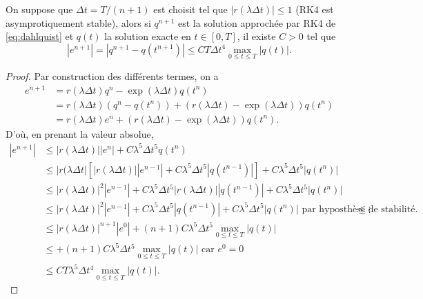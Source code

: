 \begin{proposition}
On suppose que $\Delta t = T/(n+1)$ est choisit tel que $|r(\lambda \Delta t ) | \leq 1$ (RK4 est asymprotiquement stable), alors si $q^{n+1}$ est la solution approchée par RK4 de \eqref{eq:dahlquist} et $q(t)$ la solution exacte en $t \in [0,T]$, il existe $C>0$ tel que
\begin{equation}
| e^{n+1} | = | q^{n+1} - q(t^{n+1}) | \leq C T \Delta t^4 \max_{0 \leq t \leq T} | q(t) |.
\end{equation}
\label{prop:consistance_rk4}
\end{proposition}

\begin{proof}
Par construction des différents termes, on a
\begin{align*}
e^{n+1} & = r(\lambda \Delta t) q^n - \exp \left( \lambda \Delta t \right) q(t^n) \\
	& = r(\lambda \Delta t) \left( q^n - q(t^n) \right) + \left( r(\lambda \Delta t) - \exp \left( \lambda \Delta t  \right) \right) q(t^n) \\
	& = r(\lambda \Delta t) e^n + \left( r(\lambda \Delta t) - \exp \left( \lambda \Delta t  \right) \right) q(t^n).
\end{align*}
D'où, en prenant la valeur absolue, 
\begin{align*}
|e^{n+1}| & \leq |r(\lambda \Delta t)| |e^n| + C \lambda^5 \Delta t^5 q(t^n) \\
		& \leq  |r(\lambda \Delta t| \left[ |r(\lambda \Delta t)| |e^{n-1}| + C \lambda^5 \Delta t^5 |q(t^{n-1})| \right] + C \lambda^5 \Delta t^5 |q(t^n)| \\
		& \leq |r(\lambda \Delta t)|^2 |e^{n-1}| + C \lambda^5 \Delta t^5 |r(\lambda \Delta t)| |q(t^{n-1})| + C \lambda^5 \Delta t^5 |q(t^n)| \\
		& \leq |r(\lambda \Delta t)|^2 |e^{n-1}| + C \lambda^5 \Delta t^5  |q(t^{n-1})| + C \lambda^5 \Delta t^5 |q(t^n)| \text{ par hyposthèse de stabilité.}
		& \leq \vdots \\
		& \leq |r(\lambda \Delta t)|^{n+1} | e^0 | + (n+1) C \lambda^5 \Delta t^5 \max_{0 \leq t \leq T} |q(t)| \\
		& \leq + (n+1) C \lambda^5 \Delta t^5 \max_{0 \leq t \leq T} |q(t)| \text{ car } e^0 = 0 \\
		& \leq C T \lambda^5 \Delta t^4 \max_{0 \leq t \leq T} |q(t)|.
\end{align*}
\end{proof}





